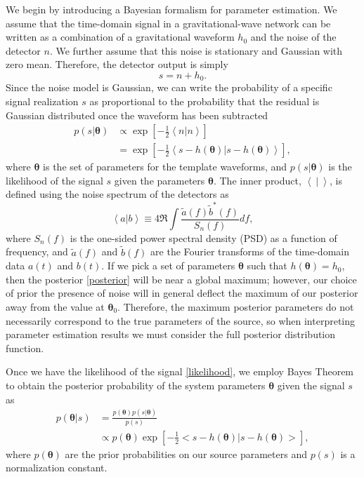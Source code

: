 \documentclass[11pt,a4paper]{emulateapj}
\newcommand{\thpara}{\boldsymbol{\theta}}
\begin{document}
We begin by introducing a Bayesian formalism for parameter estimation. 
We assume that the time-domain signal in a gravitational-wave
network can be written as a combination of a gravitational
waveform $h_0$ and the noise of the detector $n$.  We further assume
that this noise is stationary and Gaussian with zero mean.  Therefore,
the detector output is simply
\begin{equation}
s = n + h_0 .
\label{SignalAddition}
\end{equation}
Since the noise model is Gaussian, we can write the
probability of a specific signal realization $s$ as proportional to the probability
that the residual is Gaussian distributed once the waveform has been subtracted
\begin{align}
  p(s | \thpara) &\propto \exp\left[-\frac{1}{2}\left<n|n
    \right>\right] \nonumber \\ &= \exp\left[-\frac{1}{2}\left < s -
    h(\thpara) | s-h(\thpara)\right >\right] ,
  \label{likelihood}
\end{align}
where $\thpara$ is the set of parameters for the template
waveforms, and $p(s | \thpara)$ is the likelihood of the signal $s$ given the parameters $\thpara$.
  The inner product, $\left< ~|~ \right> $, is defined using the noise
spectrum of the detectors as
\begin{equation}
  \left<a|b\right> \equiv 4 \Re \int \frac{\tilde{a}(f)\tilde{b}^*(f)}{S_n(f)} df ,
  \label{innerProduct}
\end{equation}
where $S_n(f)$ is the one-sided power spectral density (PSD) as a function
of frequency, and $\tilde{a}(f)$ and $\tilde{b}(f)$ are the Fourier
transforms of the time-domain data $a(t)$ and $b(t)$.  If we pick a set of parameters $\thpara$ such that
$h(\thpara) = h_0$, then the posterior \eqref{posterior}
will be near a global maximum; however, our choice of prior the presence of noise will in
general deflect the maximum of our posterior away from the value at
$\thpara_0$.  Therefore, the maximum posterior parameters do not necessarily 
correspond to the true parameters of the source, so when interpreting parameter
 estimation results we must consider the full posterior distribution function.
 
Once we have the likelihood of the signal \eqref{likelihood}, we
employ Bayes Theorem to obtain the posterior probability of the system
parameters $\thpara$ given the signal $s$ as
\begin{align}
  p(\thpara | s) &= \frac{p(\thpara)p(s | \thpara)}{p(s)} \nonumber\\
  & \propto p(\thpara) \exp\left[-\frac{1}{2}\big < s - h(\thpara) | s-h(\thpara) \big > \right] ,
  \label{posterior}
\end{align}
where $p(\thpara)$ are the prior probabilities on our
source parameters and $p(s)$ is a normalization constant.
\end{document}
